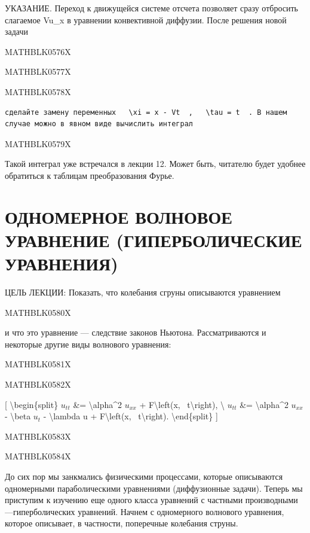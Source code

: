 \documentclass[
]{article}
\begin{document}
{{УКАЗАНИЕ. Переход к движущейся системе отсчета позволяет сразу отбросить
слагаемое Vu\_x в уравнении конвективной диффузии. После решения новой
задачи

MATHBLK0576X

MATHBLK0577X

MATHBLK0578X

\begin{verbatim}
сделайте замену переменных   \xi = x - Vt  ,   \tau = t  . В нашем случае можно в явном виде вычислить интеграл
\end{verbatim}

MATHBLK0579X

Такой интеграл уже встречался в лекции 12. Может быть, читателю будет
удобнее обратиться к таблицам преобразования Фурье.

\section{ОДНОМЕРНОЕ ВОЛНОВОЕ УРАВНЕНИЕ (ГИПЕРБОЛИЧЕСКИЕ
УРАВНЕНИЯ)}\label{ux43eux434ux43dux43eux43cux435ux440ux43dux43eux435-ux432ux43eux43bux43dux43eux432ux43eux435-ux443ux440ux430ux432ux43dux435ux43dux438ux435-ux433ux438ux43fux435ux440ux431ux43eux43bux438ux447ux435ux441ux43aux438ux435-ux443ux440ux430ux432ux43dux435ux43dux438ux44f}

ЦЕЛЬ ЛЕКЦИИ: Показать, что колебания сгруны описываются уравнением

MATHBLK0580X

и что это уравнение --- следствие законов Ньютона. Рассматриваются и
некоторые другие виды волнового уравнения:

MATHBLK0581X

MATHBLK0582X

{[} \textbackslash begin\{split\} \(u_{tt}\) \&=
\textbackslash alpha\^{}2 \(u_{xx}\) + F\textbackslash left(x,
~t\textbackslash right), \textbackslash{} \(u_{tt}\) \&=
\textbackslash alpha\^{}2 \(u_{xx}\) - \textbackslash beta \(u_t\) -
\textbackslash lambda u + F\textbackslash left(x,
~t\textbackslash right). \textbackslash end\{split\} {]}

MATHBLK0583X

MATHBLK0584X

До сих пор мы занкмались физическими процессами, которые описываются
одномерными параболическими уравнениями (диффузионные задачи). Теперь мы
приступим к изучению еще одного класса уравнений с частными
производными---гиперболических уравнений. Начнем с одномерного волнового
уравнения, которое описывает, в частности, поперечные колебания струны.

}}
\end{document}
